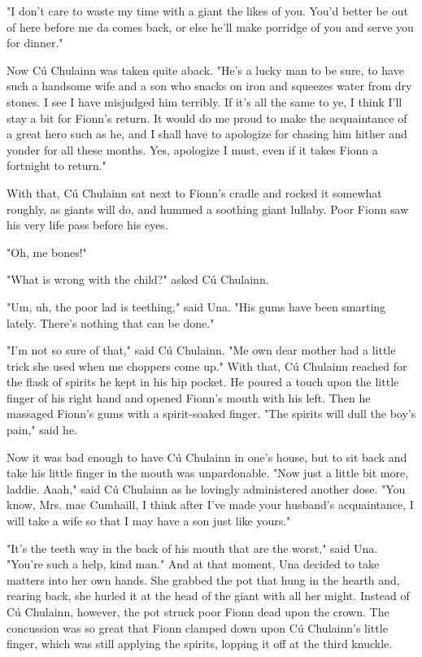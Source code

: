 "I don't care to waste my time with a giant the likes of you. You'd better be out of here before me da comes back, or else he'll make porridge of you and serve you for dinner."

Now Cú Chulainn was taken quite aback. "He's a lucky man to be sure, to have such a handsome wife and a son who snacks on iron and squeezes water from dry stones. I see I have misjudged him terribly. If it's all the same to ye, I think I'll stay a bit for Fionn's return. It would do me proud to make the acquaintance of a great hero such as he, and I shall have to apologize for chasing him hither and yonder for all these months. Yes, apologize I must, even if it takes Fionn a fortnight to return."

With that, Cú Chulainn sat next to Fionn's cradle and rocked it somewhat roughly, as giants will do, and hummed a soothing giant lullaby. Poor Fionn saw his very life pass before his eyes.

"Oh, me bones!"

"What is wrong with the child?" asked Cú Chulainn.

"Um, uh, the poor lad is teething," said Una. "His gums have been smarting lately. There's nothing that can be done."

"I'm not so sure of that," said Cú Chulainn. "Me own dear mother had a little trick she used when me choppers come up." With that, Cú Chulainn reached for the flask of spirits he kept in his hip pocket. He poured a touch upon the little finger of his right hand and opened Fionn's mouth with his left. Then he massaged Fionn's gums with a spirit-soaked finger. "The spirits will dull the boy's pain," said he.

Now it was bad enough to have Cú Chulainn in one's house, but to sit back and take his little finger in the mouth was unpardonable. "Now just a little bit more, laddie. Aaah," said Cú Chulainn as he lovingly administered another dose. "You know, Mrs. mac Cumhaill, I think after I've made your husband's acquaintance, I will take a wife so that I may have a son just like yours."

"It's the teeth way in the back of his mouth that are the worst," said Una. "You're such a help, kind man." And at that moment, Una decided to take matters into her own hands. She grabbed the pot that hung in the hearth and, rearing back, she hurled it at the head of the giant with all her might. Instead of Cú Chulainn, however, the pot struck poor Fionn dead upon the crown. The concussion was so great that Fionn clamped down upon Cú Chulainn's little finger, which was still applying the spirits, lopping it off at the third knuckle.

